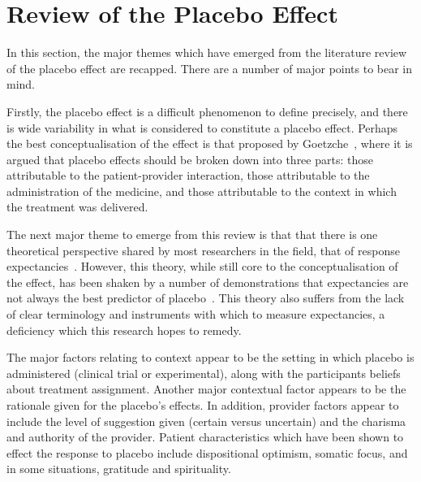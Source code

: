 \section{Review of the Placebo Effect}
\label{sec:revi-plac-effect}

In this section, the major themes which have emerged from the literature review of the placebo effect are recapped. There are a number of major points to bear in mind. 

Firstly, the placebo effect is a difficult phenomenon to define precisely, and there is wide variability in what is considered to constitute a placebo effect. Perhaps the best conceptualisation of the effect is that proposed by Goetzche~\cite{Gotzsche1995}, where it is argued that placebo effects should be broken down into three parts: those attributable to the patient-provider interaction, those attributable to the administration of the medicine, and those attributable to the context in which the treatment was delivered. 

The next major theme to emerge from this review is that that there is one theoretical perspective shared by most researchers in the field, that of response expectancies~\cite{Kirsch1997,Kirsch1985}. However, this theory, while still core to the conceptualisation of the effect, has been shaken by a number of demonstrations that expectancies are not always the best predictor of placebo~\cite{Hyland2006,Geers2005a}. This theory also suffers from the lack of clear terminology and instruments with which to measure expectancies, a deficiency which this research hopes to remedy. 

The major factors relating to context appear to be the setting in which placebo is administered (clinical trial or experimental), along with the participants beliefs about treatment assignment. Another major contextual factor appears to be the rationale given for the placebo's effects.  In addition, provider factors appear to include the level of suggestion given (certain versus uncertain) and the charisma and authority of the provider. Patient characteristics which have been shown to effect the response to placebo include dispositional optimism, somatic focus, and in some situations, gratitude and spirituality.  



